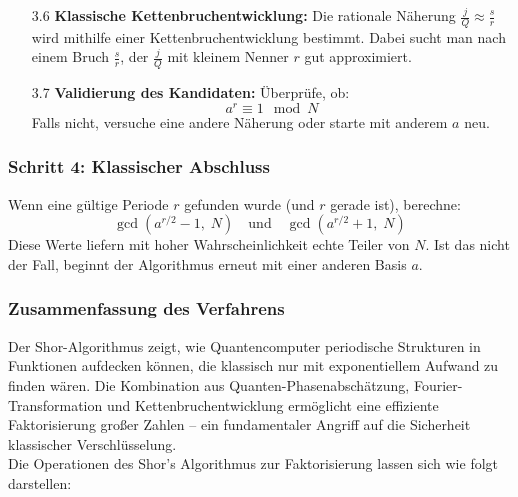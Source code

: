 \begin{enumerate}
  \item[3.6] \textbf{Klassische Kettenbruchentwicklung:}  
  Die rationale Näherung \( \frac{j}{Q} \approx \frac{s}{r} \) wird mithilfe einer Kettenbruchentwicklung bestimmt.  
  Dabei sucht man nach einem Bruch \( \frac{s}{r} \), der \( \frac{j}{Q} \) mit kleinem Nenner \( r \) gut approximiert.\\

  \item[3.7] \textbf{Validierung des Kandidaten:}  
  Überprüfe, ob:
  \[
  a^r \equiv 1 \mod N
  \]
  Falls nicht, versuche eine andere Näherung oder starte mit anderem \( a \) neu.
\end{enumerate}

\subsubsection*{Schritt 4: Klassischer Abschluss}
Wenn eine gültige Periode \( r \) gefunden wurde (und \( r \) gerade ist), berechne:
\[
\gcd\left(a^{r/2} - 1,\; N\right) \quad \text{und} \quad \gcd\left(a^{r/2} + 1,\; N\right)
\]
Diese Werte liefern mit hoher Wahrscheinlichkeit echte Teiler von \( N \). Ist das nicht der Fall, beginnt der Algorithmus erneut mit einer anderen Basis \( a \).

\subsubsection*{Zusammenfassung des Verfahrens}
Der Shor-Algorithmus zeigt, wie Quantencomputer periodische Strukturen in Funktionen aufdecken können, die klassisch nur mit exponentiellem Aufwand zu finden wären. Die Kombination aus Quanten-Phasenabschätzung, Fourier-Transformation und Kettenbruchentwicklung ermöglicht eine effiziente Faktorisierung großer Zahlen – ein fundamentaler Angriff auf die Sicherheit klassischer Verschlüsselung.\\

\noindent Die Operationen des Shor's Algorithmus zur Faktorisierung lassen sich wie folgt darstellen:

